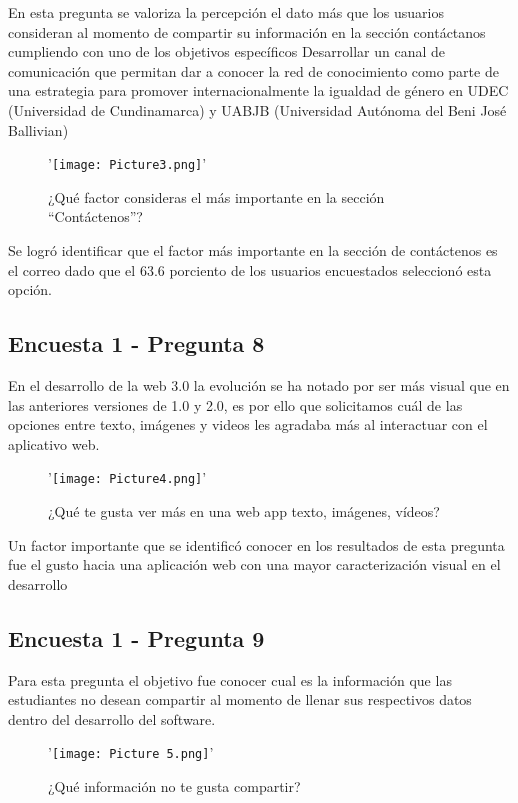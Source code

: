 \documentclass[hidelinks]{Documento}
\begin{document}
En esta pregunta se valoriza la percepción el dato más que los usuarios consideran al momento de compartir su información en la sección contáctanos cumpliendo con uno de los objetivos específicos Desarrollar un canal de comunicación que permitan dar a conocer la red de conocimiento como parte de una estrategia para promover internacionalmente la igualdad de género en UDEC (Universidad de Cundinamarca) y UABJB (Universidad Autónoma del Beni José Ballivian)

\begin{figure}[h]
\centering
'\texttt{[image: Picture3.png]}'
\caption{¿Qué factor consideras el más importante en la sección “Contáctenos”?}
\label{fig:Picture3.png}
\end{figure}

Se logró identificar que el factor más importante en la sección de contáctenos es el correo dado que el 63.6 porciento de los usuarios encuestados seleccionó esta opción.


\subsection{Encuesta 1 - Pregunta 8}

En el desarrollo de la web 3.0 la evolución se ha notado por ser más visual que en las anteriores versiones de 1.0 y 2.0, es por ello que solicitamos cuál de las opciones entre texto, imágenes y videos les agradaba más al interactuar con el aplicativo web.

\begin{figure}[h]
\centering
'\texttt{[image: Picture4.png]}'
\caption{¿Qué te gusta ver más en una web app texto, imágenes, vídeos?}
\label{fig:Picture4.png}
\end{figure}

Un factor importante que se identificó conocer en los resultados de esta pregunta fue el gusto hacia una aplicación web con una mayor caracterización visual en el desarrollo

\subsection{Encuesta 1 - Pregunta 9}

Para esta pregunta el objetivo fue conocer cual es la información que las estudiantes no desean compartir al momento de llenar sus respectivos datos dentro del desarrollo del software.

\begin{figure}[h]
\centering
'\texttt{[image: Picture 5.png]}'
\caption{¿Qué información no te gusta compartir?}
\label{fig:Picture5.png}
\end{figure}
\end{document}
